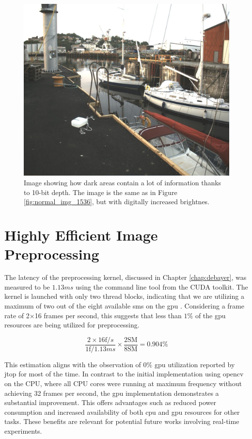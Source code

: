 \begin{figure}[H]
    \centering
    \includegraphics[width=.8\textwidth]{figures/pictures/gained_right_96.jpeg}
    \caption{Image showing how dark areas contain a lot of information thanks to 10-bit depth.
        The image is the same as in Figure \ref{fig:normal_img_1536}, but with digitally increased brightnes.}
    \label{fig:gained_image}
\end{figure}


\section{Highly Efficient Image Preprocessing}

The latency of the preprocessing kernel, discussed in Chapter \ref{chap:debayer}, was measured to be $1.13ms$ using the  command line tool from the CUDA toolkit.
The kernel is launched with only two thread blocks, indicating that we are utilizing a maximum of two out of the eight available \glspl{sm} on the \gls{gpu} \cite{rigerunNVIDIAJetsonXavier2023}.
Considering a frame rate of 2$\times$16 frames per second, this suggests that less than $1\%$ of the \gls{gpu} resources are being utilized for preprocessing.

\begin{equation}
    \frac{2 \times 16 \text{f}/s}{1 \text{f} / 1.13ms} \times \frac{2 \text{SM}}{8 \text{SM}} = 0.904\%
\end{equation}

This estimation aligns with the observation of $0\%$ \gls{gpu} utilization reported by \gls{jtop} for most of the time.
In contrast to the initial implementation using \gls{opencv} on the CPU, where all CPU cores were running at maximum frequency without achieving 32 frames per second, the \gls{gpu} implementation demonstrates a substantial improvement.
This offers advantages such as reduced power consumption and increased availability of both \gls{cpu} and \gls{gpu} resources for other tasks.
These benefits are relevant for potential future works involving real-time experiments.


